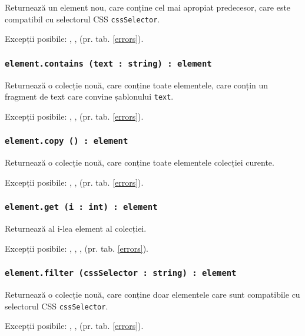 Returnează un element nou, care conține cel mai apropiat predecesor, care este compatibil cu selectorul CSS \texttt{cssSelector}.

Excepții posibile: , ,  (pr. tab. \ref{errors}).

\subsubsection{\texttt{element.contains (text : string) : element}}

Returnează o colecție nouă, care conține toate elementele, care conțin un fragment de text care convine șablonului \texttt{text}.

Excepții posibile: , ,  (pr. tab. \ref{errors}).

\subsubsection{\texttt{element.copy () : element}}

Returnează o colecție nouă, care conține toate elementele colecției curente.

Excepții posibile: , ,  (pr. tab. \ref{errors}).

\subsubsection{\texttt{element.get (i : int) : element}}

Returnează al i-lea element al colecției.

Excepții posibile: , , ,  (pr. tab. \ref{errors}).

\subsubsection{\texttt{element.filter (cssSelector : string) : element}}

Returnează o colecție nouă, care conține doar elementele care sunt compatibile cu selectorul CSS \texttt{cssSelector}.

Excepții posibile: , ,  (pr. tab. \ref{errors}).
